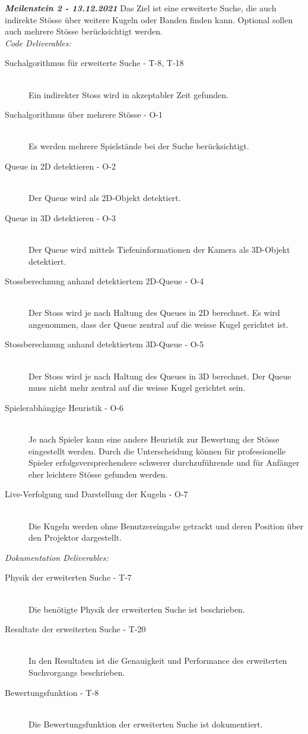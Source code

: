 \textit{\textbf{Meilenstein 2 - 13.12.2021}}
Das Ziel ist eine erweiterte Suche, die auch indirekte Stösse über weitere Kugeln oder Banden finden kann.
Optional sollen auch mehrere Stösse berücksichtigt werden.\\
\textit{Code Deliverables:}
\begin{description}
    \item[Suchalgorithmus für erweiterte Suche - T-8, T-18]\hfill \\
    Ein indirekter Stoss wird in akzeptabler Zeit gefunden.
    \item[Suchalgorithmus über mehrere Stösse - O-1]\hfill \\
    Es werden mehrere Spielstände bei der Suche berücksichtigt.
    \item[Queue in 2D detektieren - O-2]\hfill \\
    Der Queue wird als 2D-Objekt detektiert.
    \item[Queue in 3D detektieren - O-3]\hfill \\
    Der Queue wird mittels Tiefeninformationen der Kamera als 3D-Objekt detektiert.
    \item[Stossberechnung anhand detektiertem 2D-Queue - O-4]\hfill \\
    Der Stoss wird je nach Haltung des Queues in 2D berechnet. Es wird angenommen, dass der Queue zentral auf die
    weisse Kugel gerichtet ist.
    \item[Stossberechnung anhand detektiertem 3D-Queue - O-5]\hfill \\
    Der Stoss wird je nach Haltung des Queues in 3D berechnet. Der Queue muss nicht mehr zentral auf die weisse
    Kugel gerichtet sein.
    \item[Spielerabhängige Heuristik - O-6]\hfill \\
    Je nach Spieler kann eine andere Heuristik zur Bewertung der Stösse eingestellt werden. Durch die Unterscheidung
    können für professionelle Spieler erfolgsversprechendere schwerer durchzuführende und für Anfänger
    eher leichtere Stösse gefunden werden.
    \item[Live-Verfolgung und Darstellung der Kugeln - O-7]\hfill \\
    Die Kugeln werden ohne Benutzereingabe getrackt und deren Position über den Projektor dargestellt.
\end{description}
\textit{Dokumentation Deliverables:}
\begin{description}
    \item[Physik der erweiterten Suche - T-7]\hfill \\
    Die benötigte Physik der erweiterten Suche ist beschrieben.
    \item[Resultate der erweiterten Suche - T-20]\hfill \\
    In den Resultaten ist die Genauigkeit und Performance des erweiterten Suchvorgangs
    beschrieben.
    \item[Bewertungsfunktion - T-8]\hfill \\
    Die Bewertungsfunktion der erweiterten Suche ist dokumentiert.
\end{description}

